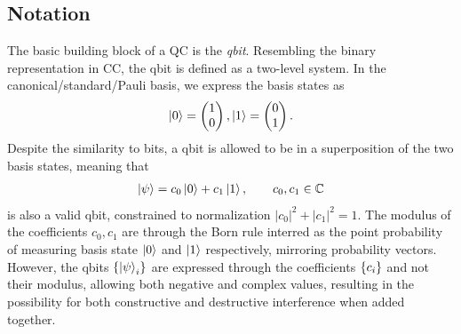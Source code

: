 \label{sec:qc}
\subsection{Notation}
The basic building block of a QC is the \textit{qbit}. Resembling the binary representation in CC, the qbit is defined as a two-level system. In the canonical/standard/Pauli basis, we express the basis states as
\begin{align*}
    \ket{0} = \begin{pmatrix}
        1 \\
        0
    \end{pmatrix}, \ket{1} = \begin{pmatrix}
        0 \\ 
        1
    \end{pmatrix}.
\end{align*}
Despite the similarity to bits, a qbit is allowed to be in a superposition of the two basis states, meaning that 
\begin{align*}
    \ket{\psi} = c_0 \ket{0} + c_1 \ket{1}, \hspace{20px} c_0,c_1 \in \mathbb{C}
\end{align*}
is also a valid qbit, constrained to normalization $|c_0|^2 + |c_1|^2 = 1$. The modulus of the coefficients $c_0,c_1$ are through the Born rule interred as the point probability of measuring basis state $\ket{0}$ and $\ket{1}$ respectively, mirroring probability vectors. However, the qbits $\{\ket{\psi}_i\}$ are expressed through the coefficients $\{c_i\}$ and not their modulus, allowing both negative and complex values, resulting in the possibility for both constructive and destructive interference when added together.


